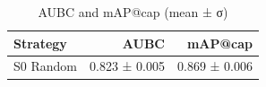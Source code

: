\begin{table}[t]
\centering
\caption{AUBC and mAP@cap (mean ± σ)}
\label{tbl:aubc}
\begin{tabular}{lrr}
\toprule
Strategy & AUBC & mAP@cap \\
\midrule
S0 Random & 0.823 ± 0.005 & 0.869 ± 0.006 \\
\bottomrule
\end{tabular}
\end{table}
